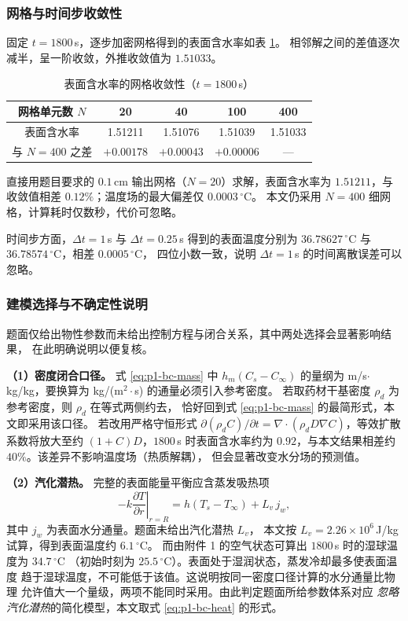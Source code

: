 \documentclass[12pt,a4paper]{ctexart}
\begin{document}
\subsubsection{网格与时间步收敛性}

固定 $t=1800$\,s，逐步加密网格得到的表面含水率如表 \ref{tab:p1-conv}。
相邻解之间的差值逐次减半，呈一阶收敛，外推收敛值为 $1.51033$。

\begin{table}[htbp]
  \centering
  \caption{表面含水率的网格收敛性（$t=1800$\,s）}
  \label{tab:p1-conv}
  \small
  \begin{tabular}{ccccc}
    \toprule
    网格单元数 $N$ & 20 & 40 & 100 & 400 \\
    \midrule
    表面含水率 & 1.51211 & 1.51076 & 1.51039 & 1.51033 \\
    与 $N=400$ 之差 & $+0.00178$ & $+0.00043$ & $+0.00006$ & --- \\
    \bottomrule
  \end{tabular}
\end{table}

直接用题目要求的 $0.1$\,cm 输出网格（$N=20$）求解，表面含水率为
$1.51211$，与收敛值相差 $0.12\%$；温度场的最大偏差仅 $0.0003\,^\circ$C。
本文仍采用 $N=400$ 细网格，计算耗时仅数秒，代价可忽略。

时间步方面，$\Delta t=1$\,s 与 $\Delta t=0.25$\,s 得到的表面温度分别为
$36.78627$\,$^\circ$C 与 $36.78574$\,$^\circ$C，相差 $0.0005$\,$^\circ$C，
四位小数一致，说明 $\Delta t=1$\,s 的时间离散误差可以忽略。

\subsubsection{建模选择与不确定性说明}
\label{sec:closure}

题面仅给出物性参数而未给出控制方程与闭合关系，其中两处选择会显著影响结果，
在此明确说明以便复核。

\textbf{（1）密度闭合口径。} 式 \eqref{eq:p1-bc-mass} 中 $h_m(C_s-C_\infty)$
的量纲为 m/s$\cdot$kg/kg，要换算为 kg/(m$^2\cdot$s) 的通量必须引入参考密度。
若取药材干基密度 $\rho_d$ 为参考密度，则 $\rho_d$ 在等式两侧约去，
恰好回到式 \eqref{eq:p1-bc-mass} 的最简形式，本文即采用该口径。
若改用严格守恒形式 $\partial(\rho_dC)/\partial t=\nabla\!\cdot\!(\rho_dD
\nabla C)$，等效扩散系数将放大至约 $(1+C)D$，$1800$\,s 时表面含水率约为
$0.92$，与本文结果相差约 $40\%$。该差异不影响温度场（热质解耦），
但会显著改变水分场的预测值。

\textbf{（2）汽化潜热。} 完整的表面能量平衡应含蒸发吸热项
\begin{equation}
  -k\left.\frac{\partial T}{\partial r}\right|_{r=R}
  =h\left(T_s-T_\infty\right)+L_v\,j_w ,
  \label{eq:p1-latent}
\end{equation}
其中 $j_w$ 为表面水分通量。题面未给出汽化潜热 $L_v$，
本文按 $L_v=2.26\times10^6$\,J/kg 试算，得到表面温度约 $6.1\,^\circ$C。
而由附件 1 的空气状态可算出 $1800$\,s 时的湿球温度为 $34.7\,^\circ$C
（初始时刻为 $25.5\,^\circ$C）。表面处于湿润状态，蒸发冷却最多使表面温度
趋于湿球温度，不可能低于该值。这说明按同一密度口径计算的水分通量比物理
允许值大一个量级，两项不能同时采用。由此判定题面所给参数体系对应
\emph{忽略汽化潜热}的简化模型，本文取式 \eqref{eq:p1-bc-heat} 的形式。
\end{document}
